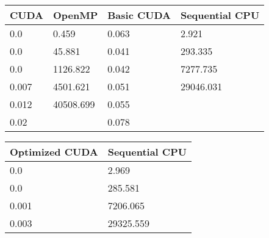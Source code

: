\begin{table}[!ht]
    \centering
    \begin{tabular}{|l|l|l|l|}
    \hline
        CUDA & OpenMP & Basic CUDA & Sequential CPU \\ \hline
        0.0 & 0.459 & 0.063 & 2.921 \\ \hline
        0.0 & 45.881 & 0.041 & 293.335 \\ \hline
        0.0 & 1126.822 & 0.042 & 7277.735 \\ \hline
        0.007 & 4501.621 & 0.051 & 29046.031 \\ \hline
        0.012 & 40508.699 & 0.055 & ~ \\ \hline
        0.02 & ~ & 0.078 & ~ \\ \hline
    \end{tabular}
\end{table}

\begin{table}[!ht]
    \centering
    \begin{tabular}{|l|l|}
    \hline
        Optimized CUDA & Sequential CPU \\ \hline
        0.0 & 2.969 \\ \hline
        0.0 & 285.581 \\ \hline
        0.001 & 7206.065 \\ \hline
        0.003 & 29325.559 \\ \hline
    \end{tabular}
\end{table}

